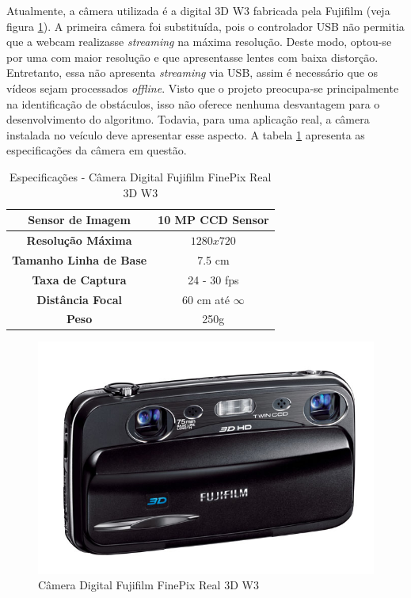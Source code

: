 Atualmente, a câmera utilizada é a digital 3D W3 fabricada pela Fujifilm (veja figura \ref{fujiW3}). A primeira câmera foi substituída, pois o controlador USB não permitia que a webcam realizasse \textit{streaming} na máxima resolução. Deste modo, optou-se por uma com maior resolução e que apresentasse lentes com baixa distorção. Entretanto, essa não apresenta \textit{streaming} via USB, assim é necessário que os vídeos sejam processados \textit{offline}. Visto que o projeto preocupa-se principalmente na identificação de obstáculos, isso não oferece nenhuma desvantagem para o desenvolvimento do algoritmo. Todavia, para uma aplicação real, a câmera instalada no veículo deve apresentar esse aspecto. A tabela \ref{fujiW3_tab} apresenta as especificações da câmera em questão.

\begin{table}[]
\centering
\caption{Especificações - Câmera Digital Fujifilm FinePix Real 3D W3}
\label{fujiW3_tab}
\begin{tabular}{|c|c|}
\hline
\textbf{Sensor de Imagem}      & 10 MP CCD Sensor  	\\	\hline
\textbf{Resolução Máxima}      & $1280x720$        	\\	\hline
\textbf{Tamanho Linha de Base} & 7.5 cm             	\\	\hline
\textbf{Taxa de Captura}      & 24 - 30 fps          	\\	\hline
\textbf{Distância Focal}       & 60 cm até $\infty$	\\	\hline
\textbf{Peso}       		      & 250g		\\	\hline
\end{tabular}
\end{table}

\begin{figure}[H]
	\centering
	\includegraphics[scale=0.35]{./Resources/fujiW3.jpg}
	\caption{Câmera Digital Fujifilm FinePix Real 3D W3}
	\label{fujiW3}
\end{figure}


